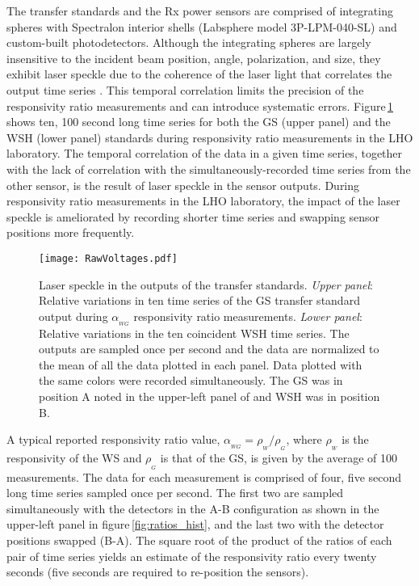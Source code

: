 \documentclass[12pt,a4paper,final]{iopart}
\begin{document}
The transfer standards and the Rx power sensors are comprised of integrating spheres with Spectralon\textsuperscript{\textregistered} interior shells (Labsphere model 3P-LPM-040-SL) and custom-built photodetectors.
Although the integrating spheres are largely insensitive to the incident beam position, angle, polarization, and size, they exhibit laser speckle due to the coherence of the laser light that correlates the output time series \cite{speckle_text}.  This temporal correlation limits the precision of the responsivity ratio measurements and can introduce systematic errors. Figure\,\ref{fig:raw_voltages} shows ten, 100 second long time series for both the GS (upper panel) and the WSH (lower panel) standards during responsivity ratio measurements in the LHO laboratory. The temporal correlation of the data in a given time series, together with the lack of correlation with the simultaneously-recorded time series from the other sensor, is the result of laser speckle in the sensor outputs. During responsivity ratio measurements in the LHO laboratory, the impact of the laser speckle is ameliorated by recording shorter time series and swapping sensor positions more frequently.
%
\begin{figure}[t]%
    \begin{center}
    \texttt{[image: RawVoltages.pdf]}
    \caption{Laser speckle in  the outputs of the transfer standards.  {\em Upper panel}: Relative variations in ten time series of the GS transfer standard output during $\alpha_{_{WG}}$ responsivity ratio measurements.    {\em Lower panel}: Relative variations in the ten coincident WSH time series.  
    The outputs are sampled once per second and the data are normalized to the mean of all the data plotted in each panel.
    Data plotted with the same colors were recorded simultaneously.
    The GS was in position A noted in the upper-left panel of  and WSH was in position B.}
    \label{fig:raw_voltages}
    \end{center}
\end{figure}
%

A typical reported responsivity ratio value, $\alpha_{_{WG}}=\rho_{_{W}}/\rho_{_{G}}$, where $\rho_{_{W}}$ is the responsivity of the WS and $\rho_{_{G}}$ is that of the GS, is given by the average of 100 measurements.  The data for each measurement is comprised of four, five second long time series sampled once per second. The first two are sampled simultaneously with the detectors in the A-B configuration as shown in the upper-left panel in figure\,\ref{fig:ratios_hist}, and the last two with the detector positions swapped (B-A).  The square root of the product of the ratios of each pair of time series yields an estimate of the responsivity ratio every twenty seconds (five seconds are required to re-position the sensors).  
\end{document}
